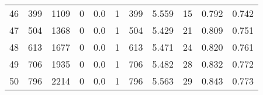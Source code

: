 \begin{tabular}{lrrrrrrrrrr}
46 &      399 &     1109 &                 0 &               0.0 &                       1 &                        399 &       5.559 &             15 &       0.792 &             0.742 \\
47 &      504 &     1368 &                 0 &               0.0 &                       1 &                        504 &       5.429 &             21 &       0.809 &             0.751 \\
48 &      613 &     1677 &                 0 &               0.0 &                       1 &                        613 &       5.471 &             24 &       0.820 &             0.761 \\
49 &      706 &     1935 &                 0 &               0.0 &                       1 &                        706 &       5.482 &             28 &       0.832 &             0.772 \\
50 &      796 &     2214 &                 0 &               0.0 &                       1 &                        796 &       5.563 &             29 &       0.843 &             0.773 \\
\bottomrule
\end{tabular}
